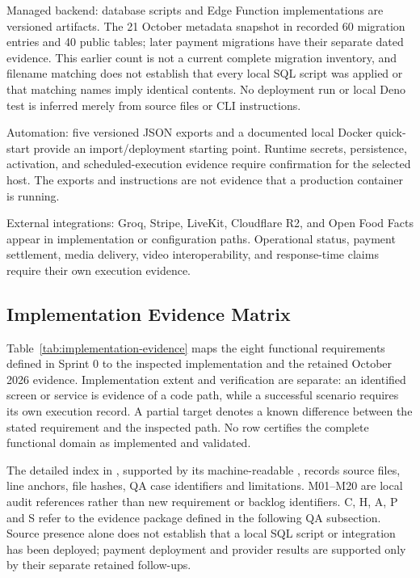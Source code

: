 \documentclass[12pt,a4paper,openany]{report}
\begin{document}
\noindent\textbullet\enspace Managed backend: database scripts and Edge Function implementations are versioned artifacts. The 21 October metadata snapshot in  recorded 60 migration entries and 40 public tables; later payment migrations have their separate dated evidence. This earlier count is not a current complete migration inventory, and filename matching does not establish that every local SQL script was applied or that matching names imply identical contents. No deployment run or local Deno test is inferred merely from source files or CLI instructions.\par

\noindent\textbullet\enspace Automation: five versioned JSON exports and a documented local Docker quick-start provide an import/deployment starting point. Runtime secrets, persistence, activation, and scheduled-execution evidence require confirmation for the selected host. The exports and instructions are not evidence that a production container is running.\par

\noindent\textbullet\enspace External integrations: Groq, Stripe, LiveKit, Cloudflare R2, and Open Food Facts appear in implementation or configuration paths. Operational status, payment settlement, media delivery, video interoperability, and response-time claims require their own execution evidence.\par

\subsection{Implementation Evidence Matrix}
\label{sec:implementation-evidence}

Table~\ref{tab:implementation-evidence} maps the eight functional requirements defined in Sprint 0 to the inspected implementation and the retained October 2026 evidence. Implementation extent and verification are separate: an identified screen or service is evidence of a code path, while a successful scenario requires its own execution record. A partial target denotes a known difference between the stated requirement and the inspected path. No row certifies the complete functional domain as implemented and validated.

The detailed index in , supported by its machine-readable , records source files, line anchors, file hashes, QA case identifiers and limitations. M01--M20 are local audit references rather than new requirement or backlog identifiers. C, H, A, P and S refer to the evidence package defined in the following QA subsection. Source presence alone does not establish that a local SQL script or integration has been deployed; payment deployment and provider results are supported only by their separate retained follow-ups.
\end{document}

